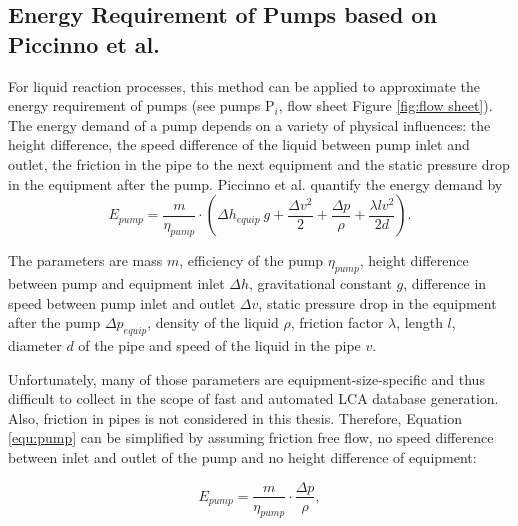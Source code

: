 \subsection{Energy Requirement of Pumps based on Piccinno et al.}
For liquid reaction processes, this method can be applied to approximate the energy requirement of pumps (see pumps P$_i$, flow sheet Figure \ref{fig:flow sheet}). The energy demand of a pump depends on a variety of physical influences: the height difference, the speed difference of the liquid between pump inlet and outlet, the friction in the pipe to the next equipment and the static pressure drop in the equipment after the pump. Piccinno et al. \cite{Piccinno.2016} quantify the energy demand by
\begin{equation}
\label{equ:pump}
    E_{pump}=\frac{m}{\eta_{pump}}\cdot \left( \Delta h_{equip} \ g+\frac{\Delta v^2}{2}+\frac{\Delta p}{\rho}+\frac{\lambda lv^2}{2d}\right).
\end{equation}


The parameters are mass $m$, efficiency of the pump \(\eta_{pump}\), height difference between pump and equipment inlet $\Delta h$,  gravitational constant $g$, difference in speed between pump inlet and outlet $\Delta v$, static pressure drop in the equipment after the pump $\Delta p_{equip}$,  density of the liquid $\rho$, friction factor $\lambda$, length $l$, diameter $d$ of the pipe and speed of the liquid in the pipe $v$.

Unfortunately, many of those parameters are equipment-size-specific and thus difficult to collect in the scope of fast and automated LCA database generation. Also, friction in pipes is not considered in this thesis. Therefore, Equation \ref{equ:pump} can be simplified by assuming friction free flow, no speed difference between inlet and outlet of the pump and no height difference of equipment:

\begin{equation}
\label{equ:pumpsimple}
    E_{pump}=\frac{m}{\eta_{pump}}\cdot\frac{\Delta p}{\rho},
\end{equation}



